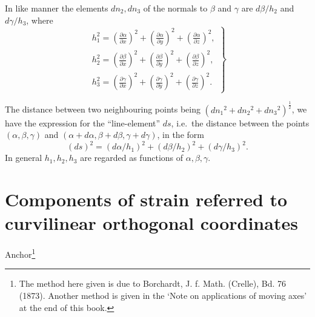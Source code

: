 In like manner the elements \(d n_2, d n_3\) of the normals to \(\beta \)
and \(\gamma \) are \(d \beta / h_2\) and \(d \gamma / h_3\), where
\begin{equation}\label{eq:31}
\left.\begin{array}{l}
h_1^2={\left(\frac{\partial \alpha}{\partial x}\right)}^2+
{\left(\frac{\partial \alpha}{\partial y}\right)}^2+
{\left(\frac{\partial \alpha}{\partial z}\right)}^2,\\
h_2^2=
{\left(\frac{\partial \beta}{\partial x}\right)}^2+
{\left(\frac{\partial \beta}{\partial y}\right)}^2+
{\left(\frac{\partial \beta}{\partial z}\right)}^2,\\
h_3^2=
{\left(\frac{\partial \gamma}{\partial x}\right)}^2+
{\left(\frac{\partial \gamma}{\partial y}\right)}^2+
{\left(\frac{\partial \gamma}{\partial z}\right)}^2.
\end{array}\right\}
\end{equation}

The distance between two neighbouring points being
\({\left(d n_1{ }^2+d n_2{ }^2+d n_3{ }^2\right)}^{\frac{1}{2}}\), we have
the expression for the ``line-element'' \(d s\), i.e.\ the distance
between the points \((\alpha, \beta, \gamma)\) and
\((\alpha+d \alpha, \beta+d \beta, \gamma+d \gamma)\), in the form
\[
{(d s)}^2={\left(d \alpha / h_1\right)}^2+
{\left(d \beta / h_2\right)}^2+{\left(d \gamma / h_3\right)}^2.
\]
In general \(h_1, h_2, h_3\) are regarded as functions of
\(\alpha, \beta, \gamma \).

\section[Curvilinear Strain]{Components of strain referred to curvilinear orthogonal coordinates}


Anchor\footnote{The method here given is due to Borchardt, J.  f. Math.
(Crelle), Bd. 76 (1873).  Another method is given in the `Note on applications
of moving axes' at the end of this book.}

